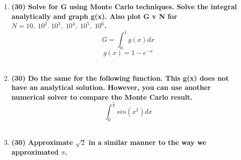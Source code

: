 \documentclass[11pt,a4paper]{article}
\begin{document}
\begin{enumerate}[leftmargin=*,topsep=0pt,font=\bfseries]
    \item\textbf{(30) Solve for G using Monte Carlo techniques. Solve the integral analytically and graph g(x). Also plot G v N for $N = 10,\;10^2.\;10^3,\;10^4,\;10^5,\;10^6$.}
        \begin{equation}
            G = \int_0^1 g(x)dx 
        \end{equation}
        \begin{equation}
            g(x)=1-e^{-x}
        \end{equation}
        \vspace{0.25in}\\

        
        
        
        
        
        
        
        
        
        
        
        
        
        
        \newpage 
    \item\textbf{(30) Do the same for the following function. This g(x) does not have an analytical solution. However, you can use another numerical solver to compare the Monte Carlo result.}
        \begin{equation}
            \int_0^{\frac{\pi}{2}}sin(x^2)dx
        \end{equation}
        \vspace{0.25in}\\














        \newpage 
    \item\textbf{(30) Approximate $\sqrt{2}$ in a similar manner to the way we approximated $\pi$.}
        \vspace{0.25in}\\



















\end{enumerate}
\end{document}
